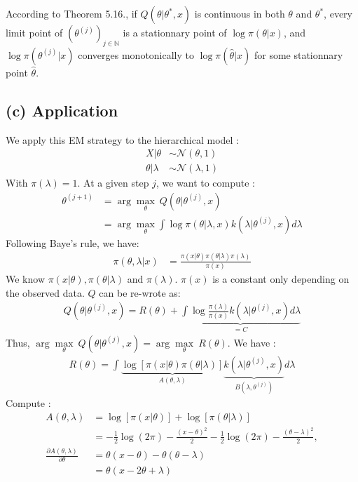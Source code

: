 \documentclass{article}
\newcommand{\N}{\mathbb N}
\begin{document}
\noindent According to Theorem 5.16., if $Q(\theta |\theta^*, x)$ is continuous 
in both $\theta$ and $\theta^*$, every limit point of $(\theta^{(j)})_{j \in \N}$
is a stationnary point of $\log \pi(\theta | x)$, and $\log \pi(\theta^{(j)} | x)$
converges monotonically to $\log \pi(\hat{\theta} |x)$ for some stationnary
point $\hat{\theta} $.


\subsection*{(c) Application}
We apply this EM strategy to the hierarchical model : 
\begin{align*}
    X|\theta &\sim \mathcal{N}(\theta, 1) \\
    \theta | \lambda &\sim \mathcal{N}(\lambda, 1)
\end{align*}
With $\pi(\lambda) = 1$.
At a given step $j$, we want to compute :
\begin{align*}
    \theta^{(j+1)} &= \arg \underset{\theta}{\max}  \  Q(\theta|\theta^{(j)}, x)  \\
    &=  \arg \underset{\theta}{\max} 
     \int \log\pi(\theta |\lambda, x) k(\lambda |\theta^{(j)}, x) d\lambda
\end{align*}
Following Baye's rule, we have:
\begin{align*}
    \pi(\theta, \lambda |x) &= \frac{\pi(x|\theta) \pi(\theta |\lambda ) \pi(\lambda)}{\pi(x)}
\end{align*}
We know $\pi(x|\theta) ,\pi(\theta |\lambda )$ and $\pi(\lambda)$. $\pi(x)$ is a constant
only depending on the observed data.
$Q$ can be re-wrote as:
\begin{align*}
    Q(\theta|\theta^{(j)}, x) = R(\theta) + 
    \underset{=C}{
    \underbrace{\int \log \frac{\pi(\lambda)}{\pi(x) } k(\lambda |\theta^{(j)}, x) d\lambda}
    }
\end{align*}
Thus, $\arg \underset{\theta}{\max}  \  Q(\theta|\theta^{(j)}, x) = \arg \underset{\theta}{\max} \ R(\theta)$.
We have :
\begin{align*}
    R(\theta) = \int \underset{A(\theta, \lambda)}{\underbrace{\log [\pi(x|\theta) \pi(\theta |\lambda )] }}
    \underset{B( \lambda, \theta^{(j)})}{\underbrace{k(\lambda|\theta^{(j)}, x)} }d\lambda
\end{align*}
Compute :
\begin{align*}
    A(\theta, \lambda)&= \log [\pi(x|\theta)] + \log [ \pi(\theta |\lambda )] \\
            &= - \frac{1}{2} \log (2\pi) - \frac{(x-\theta)^2}{2}
            - \frac{1}{2} \log (2\pi) - \frac{(\theta-\lambda)^2}{2}, \\
            \frac{\partial A(\theta, \lambda)}{\partial \theta}
            &= \theta(x-\theta) - \theta(\theta - \lambda) \\
            &= \theta(x - 2\theta +\lambda)
\end{align*}
\end{document}
